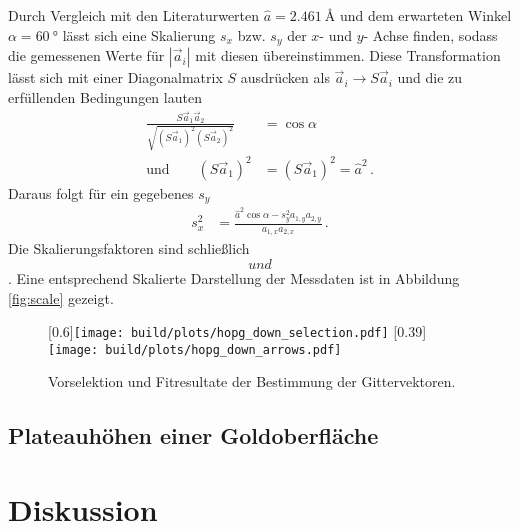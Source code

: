 Durch Vergleich mit den Literaturwerten \cite{HOPG_gittervektoren} $\hat{a}
= \SI{2.461}{\angstrom}$ und dem erwarteten Winkel $\alpha = \SI{60}{\degree}$
lässt sich
eine Skalierung $s_x$ bzw. $s_y$ der $x$- und $y$- Achse finden, sodass die
gemessenen Werte für $\left|\vec{a}_i\right|$ mit diesen übereinstimmen.
Diese Transformation lässt sich mit einer Diagonalmatrix $S$ ausdrücken als
$\vec{a}_i \to S\vec{a}_i$ und die zu erfüllenden Bedingungen lauten
\begin{align*}
    \frac{S\vec{a}_1\vec{a}_2}
         {\sqrt{\left(S\vec{a}_1\right)^2 \left(S\vec{a}_2\right)^2}}
         &= \cos{\alpha}\,\\
         \text{und}\qquad\left(S\vec{a}_1\right)^2
         &= \left(S\vec{a}_1\right)^2 = \hat{a}^2\,.
\end{align*}
Daraus folgt für ein gegebenes $s_y$
\begin{align*}
    s_x^2 &= \frac{\hat{a}^2\cos{\alpha} - s_y^2 a_{1,y} a_{2,y}}
                  {a_{1,x} a_{2,x}}\,.
\end{align*}
Die Skalierungsfaktoren sind schließlich $$ und
$$. Eine entsprechend Skalierte Darstellung der
Messdaten ist in Abbildung \ref{fig:scale} gezeigt.
\begin{figure}
    \centering
    [0.6\linewidth]{\texttt{[image: build/plots/hopg\_down\_selection.pdf]}}
    [0.39\linewidth]{\texttt{[image: build/plots/hopg\_down\_arrows.pdf]}}
    \caption{Vorselektion und Fitresultate der Bestimmung der Gittervektoren.}
    \label{fig:hopg_fit}
\end{figure}

\subsection{Plateauhöhen einer Goldoberfläche}
\label{subsec:gold}

\clearpage
\section{Diskussion}
\label{sec:diskussion}
